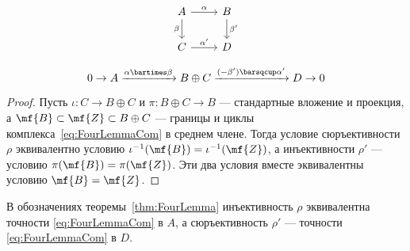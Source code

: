 \documentclass[
	extrafontsizes,
	11pt,
	hyphens,
]{memoir}
\begin{document}
\begin{theorem}
%
\begin{minipage}{0.33\linewidth}
    \begin{equation}
		\begin{tikzcd}[ampersand replacement=\&,]
		A \arrow{r}{\alpha} \arrow[swap]{d}{\beta}
			\& B \arrow{d}{\beta'} \\
		C \arrow{r}{\alpha'}
			\& D
		\end{tikzcd}
		\label{eq:FourLemmaSq}
    \end{equation}
\end{minipage}%
\begin{minipage}{0.66\linewidth}
    \begin{equation}
		0 \to A
		\xrightarrow{\alpha \bartimes \beta}
		B \oplus C
		\xrightarrow{(-\beta') \barsqcup \alpha'}
		D \to 0
		\label{eq:FourLemmaCom}
    \end{equation}
\end{minipage}
\end{theorem}

\begin{proof}
Пусть \(\iota : C \to B \oplus C\) и \(\pi : B \oplus C \to B\) --- стандартные вложение и проекция, а \(\mf{B} \subset \mf{Z} \subset B \oplus C\) --- границы и циклы комплекса~\eqref{eq:FourLemmaCom} в среднем члене.
Тогда условие сюръективности \(\rho\) эквивалентно условию \(\iota^{-1}(\mf{B}) = \iota^{-1}(\mf{Z})\), а инъективности \(\rho'\) --- условию \(\pi(\mf{B}) = \pi(\mf{Z})\).
Эти два условия вместе эквивалентны условию \(\mf{B} = \mf{Z}\).
\end{proof}

\begin{observation}
В обозначениях теоремы~\ref{thm:FourLemma} инъективность \(\rho\) эквивалентна точности \eqref{eq:FourLemmaCom} в \(A\), а сюръективность \(\rho'\) --- точности \eqref{eq:FourLemmaCom} в \(D\).
\end{observation}
\end{document}
